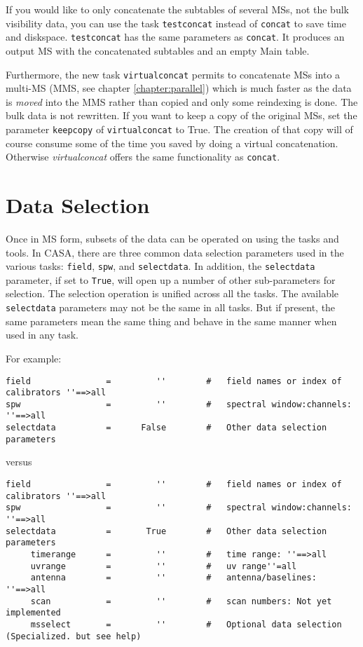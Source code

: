 If you would like to only concatenate the subtables of several 
MSs, not the bulk visibility data, you can use the task {\tt testconcat}
instead of {\tt concat} to save time and diskspace. {\tt testconcat} has
the same parameters as {\tt concat}. It produces an output MS with
the concatenated subtables and an empty Main table.

Furthermore, the new task {\tt virtualconcat} permits to concatenate
MSs into a multi-MS (MMS, see chapter \ref{chapter:parallel}) 
which is much faster as the data is {\it moved}
into the MMS rather than copied and only some reindexing is done. 
The bulk data is not rewritten.
If you want to keep a copy of the original
MSs, set the parameter {\tt keepcopy} of {\tt virtualconcat} to True. 
The creation of that copy will of course consume some of the time you 
saved by doing a virtual concatenation. 
Otherwise {\it virtualconcat} offers the same functionality as {\tt concat}.

\section{Data Selection}
\label{section:io.selection}

Once in MS form, subsets of the data can be operated on using the tasks and
tools.  In CASA, there are three common data selection parameters used in
the various
tasks: {\tt field}, {\tt spw}, and {\tt selectdata}.  In addition, the
{\tt selectdata} parameter, if set to {\tt True}, will open up a
number of other sub-parameters 
for selection.  The selection operation is unified across all the tasks.  The
available {\tt selectdata} parameters may not be the same in all tasks.  But if
present, the same parameters mean the same thing and behave in the
same manner when used in any task.

For example:
\small
\begin{verbatim}
field               =         ''        #   field names or index of calibrators ''==>all
spw                 =         ''        #   spectral window:channels: ''==>all
selectdata          =      False        #   Other data selection parameters
\end{verbatim}
\normalsize
versus
\small
\begin{verbatim}
field               =         ''        #   field names or index of calibrators ''==>all
spw                 =         ''        #   spectral window:channels: ''==>all
selectdata          =       True        #   Other data selection parameters
     timerange      =         ''        #   time range: ''==>all 
     uvrange        =         ''        #   uv range''=all
     antenna        =         ''        #   antenna/baselines: ''==>all
     scan           =         ''        #   scan numbers: Not yet implemented
     msselect       =         ''        #   Optional data selection (Specialized. but see help)

\end{verbatim}
\normalsize

